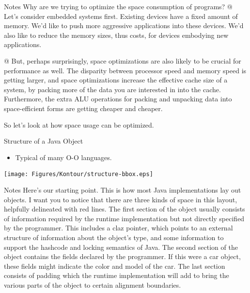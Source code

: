 \documentclass[%
pdf,
colorBG,
slideColor,
nototal,
oqe
]{prosper}
\newenvironment{talknotes}{\begin{slide}{Notes}\tiny}{\end{slide}}
\begin{document}
\begin{talknotes}
Why are we trying to optimize the space consumption of programs?
@ Let's consider embedded systems first. Existing devices have a
fixed amount of memory.  We'd like to push more aggressive
applications into these devices. We'd also like to reduce the memory
sizes, thus costs, for devices embodying new applications.

@ But, perhaps surprisingly, space optimizations are also likely to be
crucial for performance as well.  The disparity between processor
speed and memory speed is getting larger, and space optimizations
increase the effective cache size of a system, by packing more of the
data you are interested in into the cache.  Furthermore, the extra
ALU operations for packing and unpacking data into space-efficient
forms are getting cheaper and cheaper.

So let's look at how space usage can be optimized.
\end{talknotes}

\begin{slide}{Structure of a Java Object}
\begin{itemize}
\item Typical of many O-O languages.
\end{itemize}
\begin{center}
\texttt{[image: Figures/Kontour/structure-bbox.eps]}
\end{center}
\end{slide}

\begin{talknotes}
Here's our starting point.  This is how most Java implementations lay
out objects.  I want you to notice that there are three kinds of space
in this layout, helpfully delineated with red lines.  The first
section of the object usually consists of information required by
the runtime implementation but not directly specified by the
programmer.  This includes a claz pointer, which points to an
external structure of information about the object's type, and
some information to support the hashcode and locking semantics of
Java.  %
The second section of the object contains the fields declared by
the programmer.  If this were a car object, these fields might
indicate the color and model of the car.  The last section
consists of padding which the runtime implementation will
add to bring the various parts of the object to certain alignment
boundaries.
\end{talknotes}
\end{document}
